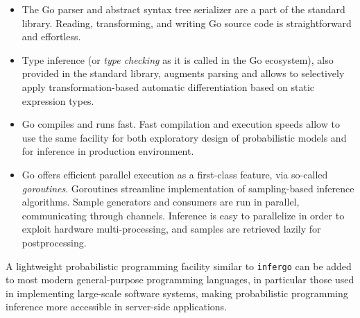 \documentclass[sigplan,review]{acmart}\settopmatter{printfolios=true,printccs=false,printacmref=false}
\begin{document}
\begin{itemize}
	\item The Go parser and abstract syntax tree serializer are a
		part of the standard library. Reading, transforming, and
		writing Go source code is straightforward and effortless.
	\item Type inference (or \textit{type checking} as it is
		called in the Go ecosystem), also provided in the
		standard library, augments parsing and allows to
		selectively apply transformation-based automatic
		differentiation  based on static expression types. 
	\item Go compiles and runs fast. Fast compilation and
		execution speeds allow to use the same facility for both
		exploratory design of probabilistic models and for
		inference in production environment.
	\item Go offers efficient parallel execution as a
		first-class feature, via so-called \textit{goroutines}.
		Goroutines streamline implementation of sampling-based
		inference algorithms. Sample generators and consumers
		are run in parallel, communicating through channels. 
		Inference is easy to parallelize in order to exploit
		hardware multi-processing, and samples are retrieved
		lazily for postprocessing. 
\end{itemize}

A lightweight probabilistic programming facility similar to
\texttt{infergo} can be added to most modern general-purpose
programming languages, in particular those used in implementing
large-scale software systems, making probabilistic
programming inference more accessible in server-side
applications.


\end{document}
